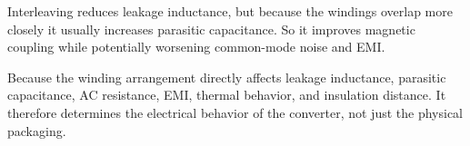 \begin{solutionblock}
    Interleaving reduces leakage inductance, but because the windings overlap more closely it usually increases parasitic capacitance. So it improves magnetic coupling while potentially worsening common-mode noise and EMI.
\end{solutionblock}

\begin{solutionblock}
    Because the winding arrangement directly affects leakage inductance, parasitic capacitance, AC resistance, EMI, thermal behavior, and insulation distance. It therefore determines the electrical behavior of the converter, not just the physical packaging.
\end{solutionblock}
